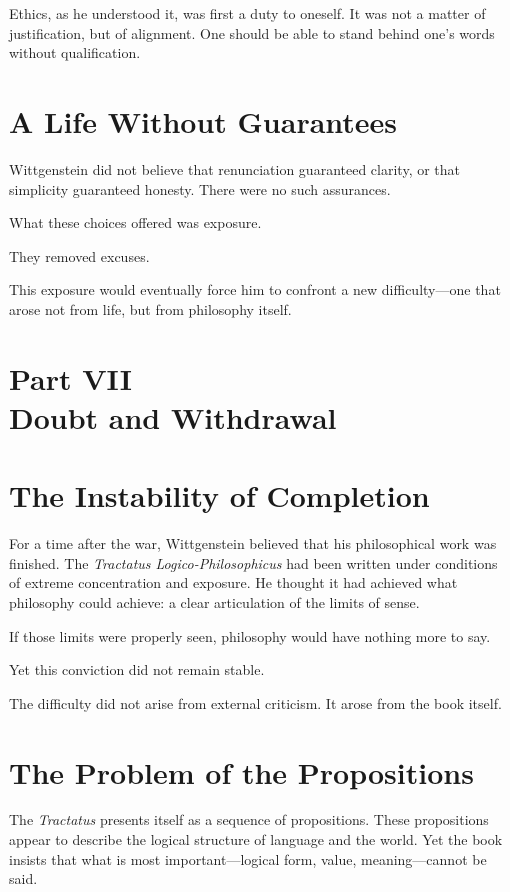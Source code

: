 \documentclass[11pt]{article}
\begin{document}
Ethics, as he understood it, was first a duty to oneself. It was not a matter of justification, but of alignment. One should be able to stand behind one’s words without qualification.

\section*{A Life Without Guarantees}

Wittgenstein did not believe that renunciation guaranteed clarity, or that simplicity guaranteed honesty. There were no such assurances.

What these choices offered was exposure.

They removed excuses.

This exposure would eventually force him to confront a new difficulty—one that arose not from life, but from philosophy itself.

\newpage
\section*{Part VII \\ Doubt and Withdrawal}

\section*{The Instability of Completion}

For a time after the war, Wittgenstein believed that his philosophical work was finished. The \emph{Tractatus Logico-Philosophicus} had been written under conditions of extreme concentration and exposure. He thought it had achieved what philosophy could achieve: a clear articulation of the limits of sense.

If those limits were properly seen, philosophy would have nothing more to say.

Yet this conviction did not remain stable.

The difficulty did not arise from external criticism. It arose from the book itself.

\section*{The Problem of the Propositions}

The \emph{Tractatus} presents itself as a sequence of propositions. These propositions appear to describe the logical structure of language and the world. Yet the book insists that what is most important—logical form, value, meaning—cannot be said.
\end{document}
